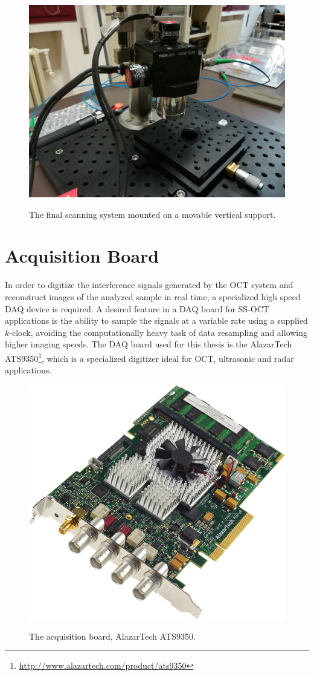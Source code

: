 \begin{figure}[bth]
	\myfloatalign
	{\includegraphics[width=0.75\linewidth]{gfx/ch3/testa}}
	\caption{The final scanning system mounted on a movable vertical support.}\label{fig:testa}
\end{figure}
	
	\newpage
\section{Acquisition Board}
	
	In order to digitize the interference signals generated by the OCT system and reconstruct images of the analyzed sample in real time, a specialized high speed \acf{DAQ} device is required. A desired feature in a \ac{DAQ} board for SS-OCT applications is the ability to sample the signals at a variable rate using a supplied $k$-clock, avoiding the computationally heavy task of data resampling and allowing higher imaging speeds. The \ac{DAQ} board used for this thesis is the AlazarTech ATS9350\footnote{\url{http://www.alazartech.com/product/ats9350}}, which is a specialized digitizer ideal for OCT, ultrasonic and radar applications. 
	
	
	\begin{figure}[bth]
		\myfloatalign
		{\includegraphics[width=.6\linewidth]{gfx/board}}
		\caption{The acquisition board, AlazarTech ATS9350.}\label{fig:acq-board}
	\end{figure}


